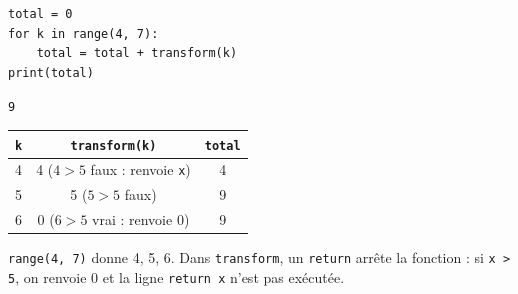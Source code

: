 \documentclass[addpoints, 11pt]{exam}
\newcommand{\code}[1]{\texttt{#1}}
\DeclareRobustCommand{\_}{\textunderscore\allowbreak}
\begin{document}
\begin{questions}
\begin{parts}
\begin{lstlisting}
total = 0
for k in range(4, 7):
    total = total + transform(k)
print(total)
\end{lstlisting}
\begin{reponse}
\code{9}
\end{reponse}
\begin{center}
\begin{tabular}{|c|c|c|}
\hline
\code{k} & \code{transform(k)} & \code{total} \\ \hline
4 & 4 ($4 > 5$ faux : renvoie \code{x}) & 4 \\
5 & 5 ($5 > 5$ faux) & 9 \\
6 & 0 ($6 > 5$ vrai : renvoie 0) & 9 \\ \hline
\end{tabular}
\end{center}
\code{range(4, 7)} donne 4, 5, 6. Dans \code{transform}, un \code{return} arrête la fonction : si \code{x > 5}, on renvoie 0 et la ligne \code{return x} n'est pas exécutée.
\end{parts}
\end{questions}
\end{document}
